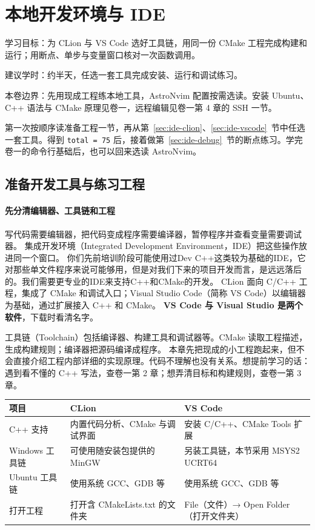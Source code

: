 \chapter{本地开发环境与 IDE}
\label{chap:ide-tools}

\begin{introduction}
  \item 学习目标：为 CLion 与 VS Code 选好工具链，用同一份 CMake 工程完成构建和运行；用断点、单步与变量窗口核对一次函数调用。
  \item 建议学时：约半天，任选一套工具完成安装、运行和调试练习。
  \item 本卷边界：先用现成工程练本地工具，AstroNvim 配置按需选读。安装 Ubuntu、C++ 语法与 CMake 原理见卷一，远程编辑见卷一第 4 章的 SSH 一节。
\end{introduction}

第一次按顺序读准备工程一节，再从第~\ref{sec:ide-clion}、\ref{sec:ide-vscode}~节中任选一套工具。得到 \texttt{total = 75} 后，接着做第~\ref{sec:ide-debug}~节的断点练习。学完卷一的命令行基础后，也可以回来选读 AstroNvim。

\begingroup
\setlength{\emergencystretch}{3em}
\section{准备开发工具与练习工程}
\subsubsection{先分清编辑器、工具链和工程}

写代码需要编辑器，把代码变成程序需要编译器，暂停程序并查看变量需要调试器。
集成开发环境（Integrated Development Environment，IDE）把这些操作放进同一个窗口。
你们先前培训阶段可能使用过Dev C++这类较为基础的IDE，它对那些单文件程序来说可能够用，但是对我们下来的项目开发而言，是远远落后的。我们需要更专业的IDE来支持C++和CMake的开发。
CLion 面向 C/C++ 工程，集成了 CMake 和调试入口；Visual Studio Code（简称 VS Code）以编辑器为基础，通过扩展接入 C++ 和 CMake。
\textbf{VS Code 与 Visual Studio 是两个软件}，下载时看清名字。

工具链（Toolchain）包括编译器、构建工具和调试器等。CMake 读取工程描述，生成构建规则；编译器把源码编译成程序。
本章先把现成的小工程跑起来，但不会直接介绍工程内部详细的实现原理。代码不理解也没有关系。想提前学习的话：遇到看不懂的 C++ 写法，查卷一第 2 章；想弄清目标和构建规则，查卷一第 3 章。

\begin{center}
\begin{tabular}{p{}p{}p{}}
\toprule[1.5pt]
项目 & CLion & VS Code\\
\midrule[1pt]
C++ 支持 & 内置代码分析、CMake 与调试界面 & 安装 C/C++、CMake Tools 扩展\\
Windows 工具链 & 可使用随安装包提供的 MinGW & 另装工具链，本节采用 MSYS2 UCRT64\\
Ubuntu 工具链 & 使用系统 GCC、GDB 等 & 使用系统 GCC、GDB 等\\
打开工程 & 打开含 CMakeLists.txt 的文件夹 & File（文件）→ Open Folder（打开文件夹）\\
\bottomrule[1.5pt]
\end{tabular}
\end{center}

